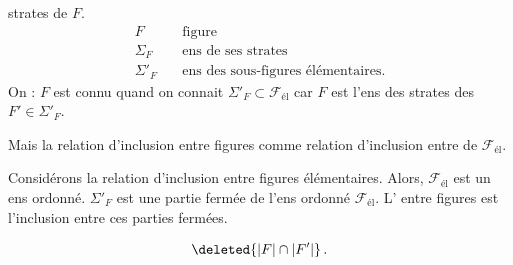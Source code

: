 strates de $F$. 
\[
\begin{aligned}
 F &\quad \text{figure}\\
 \Sigma_F &\quad \text{ens de ses strates}\\
 \Sigma'_F &\quad \text{ens des sous-figures élémentaires.}
\end{aligned}
\]
On :
$F$ est connu quand on connait $\Sigma'_F\subset\mathcal{F}_{\text{él}}$ car $F$ est l'ens des strates des $F'\in\Sigma'_F$.

Mais la relation d'inclusion entre figures  comme relation d'inclusion entre  de $\mathcal{F}_{\text{él}}$.


Considérons la relation d'inclusion \inserted{$\leq$} entre figures élémentaires. Alors, $\mathcal{F}_{\text{él}}$ est un ens ordonné.     $\Sigma'_F$ est une partie fermée de l'ens ordonné $\mathcal{F}_{\text{él}}$. L' entre figures est l'inclusion entre ces parties fermées.





\[
\deleted{\lvert F\rvert\cap\lvert F'\rvert}\,.
\]

